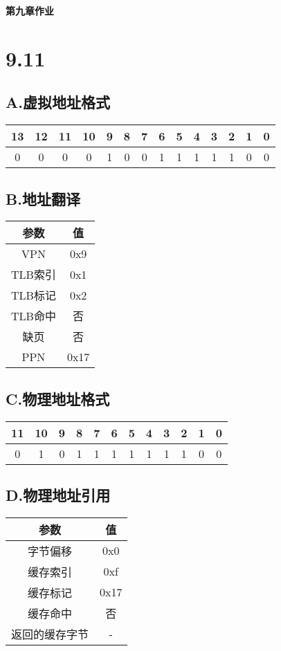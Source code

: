 \documentclass[11pt]{article}
\begin{document}
\begin{center}
  \textbf{\Huge{第九章作业}}
\end{center}

\section*{9.11}
\subsection*{A.虚拟地址格式}
\begin{tabular}[htbp!]{|c|c|c|c|c|c|c|c|c|c|c|c|c|c|}
  \toprule
  13 & 12 & 11 & 10 & 9 & 8 & 7 & 6 & 5 & 4 & 3 & 2 & 1 & 0 \\
  \midrule
  0 &  0 &  0 &  0 & 1 & 0 & 0 & 1 & 1 & 1 & 1 & 1 & 0 & 0 \\
  \bottomrule
\end{tabular}

\subsection*{B.地址翻译}
\begin{tabular}[htbp!]{|c|c|}
  \toprule
  参数 & 值 \\\midrule
  VPN & 0x9 \\\midrule
  TLB索引 & 0x1 \\\midrule
  TLB标记 & 0x2 \\\midrule
  TLB命中 & 否 \\\midrule
  缺页 & 否 \\\midrule
  PPN & 0x17 \\\bottomrule
\end{tabular}

\subsection*{C.物理地址格式}
\begin{tabular}[htbp!]{|c|c|c|c|c|c|c|c|c|c|c|c|}
  \toprule
  11 & 10 & 9 & 8 & 7 & 6 & 5 & 4 & 3 & 2 & 1 & 0 \\
  \midrule
  0 &  1 & 0 & 1 & 1 & 1 & 1 & 1 & 1 & 1 & 0 & 0 \\
  \bottomrule
\end{tabular}

\subsection*{D.物理地址引用}
\begin{tabular}[htbp!]{|c|c|}
  \toprule
  参数 & 值 \\\midrule
  字节偏移 & 0x0 \\\midrule
  缓存索引 & 0xf \\\midrule
  缓存标记 & 0x17 \\\midrule
  缓存命中 & 否 \\\midrule
  返回的缓存字节 & - \\\bottomrule
\end{tabular}
\end{document}
